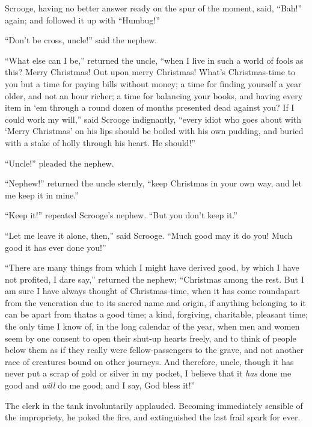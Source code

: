 \documentclass[paper=5.5in:8.5in,BCOR=7mm,twoside,DIV=calc,12pt,usegeometry]{scrbook} %
\begin{document}
Scrooge, having no better answer ready on the spur of the moment, said, \enquote{Bah!} again; and followed it up with \enquote{Humbug!}

\enquote{Don't be cross, uncle!} said the nephew.

\enquote{What else can I be,} returned the uncle, \enquote{when I live in such a world of fools as this? Merry Christmas! Out upon merry Christmas! What's Christmas-time to you but a time for paying bills without money; a time for finding yourself a year older, and not an hour richer; a time for balancing your books, and having every item in `em through a round dozen of months presented dead against you? If I could work my will,} said Scrooge indignantly, \enquote{every idiot who goes about with \enquote{Merry Christmas} on his lips should be boiled with his own pudding, and buried with a stake of holly through his heart. He should!}

\enquote{Uncle!} pleaded the nephew.

\enquote{Nephew!} returned the uncle sternly, \enquote{keep Christmas in your own way, and let me keep it in mine.}

\enquote{Keep it!} repeated Scrooge's nephew. \enquote{But you don't keep it.}

\enquote{Let me leave it alone, then,} said Scrooge. \enquote{Much good may it do you! Much good it has ever done you!}

\enquote{There are many things from which I might have derived good, by which I have not profited, I dare say,} returned the nephew; \enquote{Christmas among the rest. But I am sure I have always thought of Christmas-time, when it has come round\textemdash apart from the veneration due to its sacred name and origin, if anything belonging to it can be apart from that\textemdash as a good time; a kind, forgiving, charitable, pleasant time; the only time I know of, in the long calendar of the year, when men and women seem by one consent to open their shut-up hearts freely, and to think of people below them as if they really were fellow-passengers to the grave, and not another race of creatures bound on other journeys. And therefore, uncle, though it has never put a scrap of gold or silver in my pocket, I believe that it \textit{has} done me good and \textit{will} do me good; and I say, God bless it!}

The clerk in the tank involuntarily applauded. Becoming immediately sensible of the impropriety, he poked the fire, and extinguished the last frail spark for ever.
\end{document}
